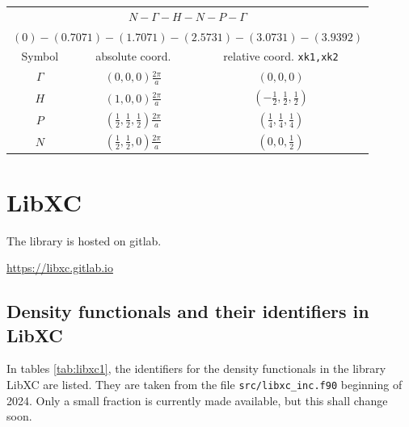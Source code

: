 \documentclass[final,12pt,makeidx,DIV=calc]{article}
\begin{document}
{{{{{{\begin{center}
\renewcommand\arraystretch{1.5}
\begin{tabular}{|c|c|c|}
\hline
\multicolumn{3}{|c|}{$N-\Gamma-H-N-P-\Gamma$}\\
\multicolumn{3}{|c|}{$(0)-(0.7071)-(1.7071)-(2.5731)-(3.0731)-(3.9392)$}\\
\hline
Symbol & absolute coord. & relative coord. \texttt{xk1,xk2}\\
\hline
$\Gamma$   & $(0,0,0) \frac{2\pi}{a}$ & $(0,0,0)$ \\ 
$H$        & $(1,0,0) \frac{2\pi}{a}$ & $(-\frac{1}{2},\frac{1}{2},\frac{1}{2})$ \\ 
$P$        & $(\frac{1}{2},\frac{1}{2},\frac{1}{2}) \frac{2\pi}{a}$ & $(\frac{1}{4},\frac{1}{4},\frac{1}{4})$ \\ 
$N$        & $(\frac{1}{2},\frac{1}{2},0) \frac{2\pi}{a}$ & $(0,0,\frac{1}{2})$ \\ 
\hline
\end{tabular}
\renewcommand\arraystretch{1.}
\end{center}
\clearpage


\newpage
\section{LibXC}
\label{sec:libxc}
The library is hosted on gitlab. 

\url{https://libxc.gitlab.io}

\newpage
\subsection{Density functionals and their identifiers in LibXC}
\label{sec:libxcids}
In tables \ref{tab:libxc1}, the identifiers for the density
functionals in the library LibXC are listed. They are taken from the
file \verb|src/libxc_inc.f90| beginning of 2024. Only a small fraction
is currently made available, but this shall change soon.


}}}}}}
\end{document}
